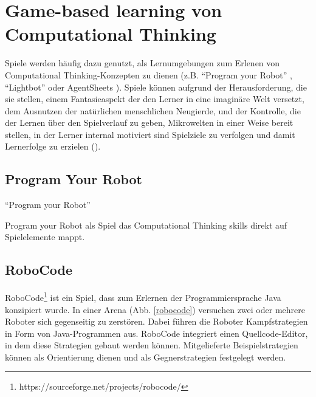 \section{Game-based learning von Computational Thinking}

Spiele werden häufig dazu genutzt, als Lernumgebungen zum Erlenen von Computational
Thinking-Konzepten zu dienen (z.B. \enquote{Program your Robot} \cite{kazimoglu_serious_2012},
\enquote{Lightbot} \cite{gouws2013computational} oder AgentSheets \cite{repenning2010scalable}).
Spiele können aufgrund der Herausforderung, die sie stellen, einem Fantasieaspekt der den Lerner in
eine imaginäre Welt versetzt, dem Ausnutzen der natürlichen menschlichen Neugierde, und der
Kontrolle, die der Lernen über den Spielverlauf zu geben, Mikrowelten in einer Weise bereit stellen,
in der Lerner internal motiviert sind Spielziele zu verfolgen und damit Lernerfolge zu erzielen
(\cite{rieber_seriously_1996}).

\subsection{Program Your Robot}
 
\enquote{Program your Robot} \cite{kazimoglu_serious_2012}

Program your Robot als Spiel das Computational Thinking skills direkt auf Spielelemente mappt.

\subsection{RoboCode}

RoboCode\footnote{https://sourceforge.net/projects/robocode/} ist ein Spiel, dass zum Erlernen der
Programmiersprache Java konzipiert wurde. In einer Arena (Abb. \ref{robocode}) versuchen zwei oder mehrere Roboter sich
gegenseitig zu zerstören. Dabei führen die Roboter Kampfstrategien in Form von Java-Programmen aus.
RoboCode integriert einen Quellcode-Editor, in dem diese Strategien gebaut werden können.
Mitgelieferte Beispielstrategien können als Orientierung dienen und als Gegnerstrategien festgelegt
werden.

